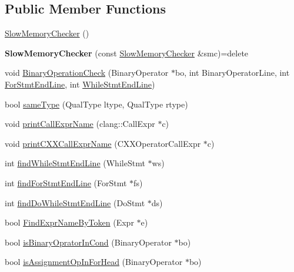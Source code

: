 \subsection*{Public Member Functions}
\begin{DoxyCompactItemize}
\item 
\hyperlink{classSlowMemoryChecker_aafb7e74263259c4c229d369676711b96}{Slow\+Memory\+Checker} ()
\item 
\mbox{\label{classSlowMemoryChecker_a6b14a889e02bdb4777b869ba0126c3f7}} 
{\bfseries Slow\+Memory\+Checker} (const \hyperlink{classSlowMemoryChecker}{Slow\+Memory\+Checker} \&smc)=delete
\item 
void \hyperlink{classSlowMemoryChecker_addf5d951f4735a6a997dcf06a425192e}{Binary\+Operation\+Check} (Binary\+Operator $\ast$bo, int Binary\+Operator\+Line, int \hyperlink{classSlowMemoryChecker_a230d1bf30480bb33d1ed48e4f1e49074}{For\+Stmt\+End\+Line}, int \hyperlink{classSlowMemoryChecker_a71abe72c12d48e7763aaff2a2af2520d}{While\+Stmt\+End\+Line})
\item 
bool \hyperlink{classSlowMemoryChecker_a1be08d6dc0b018dae13f322237c876bf}{same\+Type} (Qual\+Type ltype, Qual\+Type rtype)
\item 
void \hyperlink{classSlowMemoryChecker_a8412000ccd35734216b9a1fc5b99de36}{print\+Call\+Expr\+Name} (clang\+::\+Call\+Expr $\ast$c)
\item 
void \hyperlink{classSlowMemoryChecker_aa931eca07137a39bcaa9f73008509fe5}{print\+C\+X\+X\+Call\+Expr\+Name} (C\+X\+X\+Operator\+Call\+Expr $\ast$c)
\item 
int \hyperlink{classSlowMemoryChecker_ab0d9194cf13d5a1419ca7b22c0c0d87b}{find\+While\+Stmt\+End\+Line} (While\+Stmt $\ast$ws)
\item 
int \hyperlink{classSlowMemoryChecker_ade0f9d36e7f56ab233ed85728fa414f7}{find\+For\+Stmt\+End\+Line} (For\+Stmt $\ast$fs)
\item 
int \hyperlink{classSlowMemoryChecker_a52801e0ccf9bf4bf9c92b2edee32b87d}{find\+Do\+While\+Stmt\+End\+Line} (Do\+Stmt $\ast$ds)
\item 
bool \hyperlink{classSlowMemoryChecker_a3100c7b5ee2060470b1626001b7cd2f0}{Find\+Expr\+Name\+By\+Token} (Expr $\ast$e)
\item 
bool \hyperlink{classSlowMemoryChecker_ab966e1b0878f20f8e0948026122949ee}{is\+Binary\+Oprator\+In\+Cond} (Binary\+Operator $\ast$bo)
\item 
bool \hyperlink{classSlowMemoryChecker_a33f70c0075e5258d7f0a9ee80e17aa51}{is\+Assignment\+Op\+In\+For\+Head} (Binary\+Operator $\ast$bo)

\end{DoxyCompactItemize}
